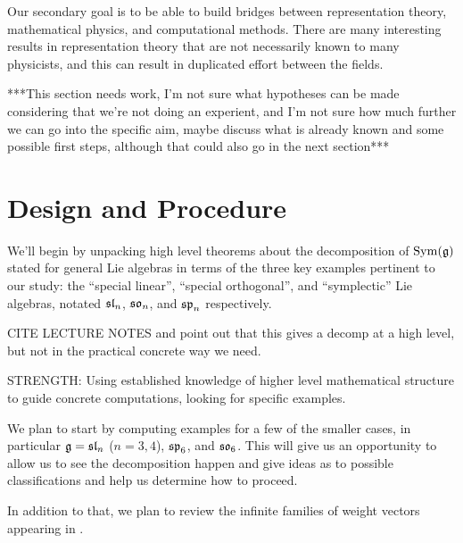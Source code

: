 \documentclass[11pt, reqno]{amsart}
\begin{document}
Our secondary goal is to be able to build bridges between representation theory, mathematical physics, and computational methods. There are many interesting results in representation theory that are not necessarily known to many physicists, and this can result in duplicated effort between the fields.







***This section needs work, I'm not sure what hypotheses can be made considering that we're not doing an experient, and I'm not sure how much further we can go into the specific aim, maybe discuss what is already known and some possible first steps, although that could also go in the next section***

\section{Design and Procedure}




We'll begin by unpacking high level theorems about the decomposition of $\operatorname{Sym}(\mathfrak{g})$ stated for general Lie algebras in terms of the three key examples pertinent to our study: the ``special linear'', ``special orthogonal'', and ``symplectic'' Lie algebras, notated $\mathfrak{sl}_n$, $\mathfrak{so}_n$, and $\mathfrak{sp}_n$ respectively.

CITE LECTURE NOTES and point out that this gives a decomp at a high level, but not in the practical concrete way we need.

STRENGTH: Using established knowledge of higher level mathematical structure to guide concrete computations, looking for specific examples. 

We plan to start by computing examples for a few of the smaller cases, in particular $\mathfrak{g} = \mathfrak{sl}_{n}$ ($n = 3, 4$), $\mathfrak{sp}_{6}$, and $\mathfrak{so}_{6}$. This will give us an opportunity to allow us to see the decomposition happen and give ideas as to possible classifications and help us determine how to proceed.

In addition to that, we plan to review the infinite families of weight vectors appearing in \cite{C20}. %
\end{document}
